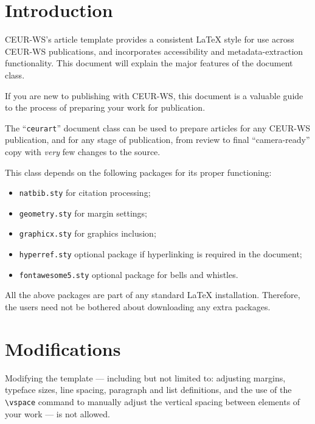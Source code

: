 \documentclass[
]{ceurart}
\begin{document}
\maketitle

\section{Introduction}

CEUR-WS's article template provides a consistent \LaTeX{} style for
use across CEUR-WS publications, and incorporates accessibility and
metadata-extraction functionality. This document will explain the
major features of the document class.

If you are new to publishing with CEUR-WS, this document is a valuable
guide to the process of preparing your work for publication.

The ``\verb|ceurart|'' document class can be used to prepare articles
for any CEUR-WS publication, and for any stage of publication, from
review to final ``camera-ready'' copy with {\itshape very} few changes
to the source.

This class depends on the following packages
for its proper functioning:

\begin{itemize}
\item \verb|natbib.sty| for citation processing;
\item \verb|geometry.sty| for margin settings;
\item \verb|graphicx.sty| for graphics inclusion;
\item \verb|hyperref.sty| optional package if hyperlinking is required in
  the document;
\item \verb|fontawesome5.sty| optional package for bells and whistles.
\end{itemize}

All the above packages are part of any
standard \LaTeX{} installation.
Therefore, the users need not be
bothered about downloading any extra packages.

\section{Modifications}

Modifying the template --- including but not limited to: adjusting
margins, typeface sizes, line spacing, paragraph and list definitions,
and the use of the \verb|\vspace| command to manually adjust the
vertical spacing between elements of your work --- is not allowed.
\end{document}
